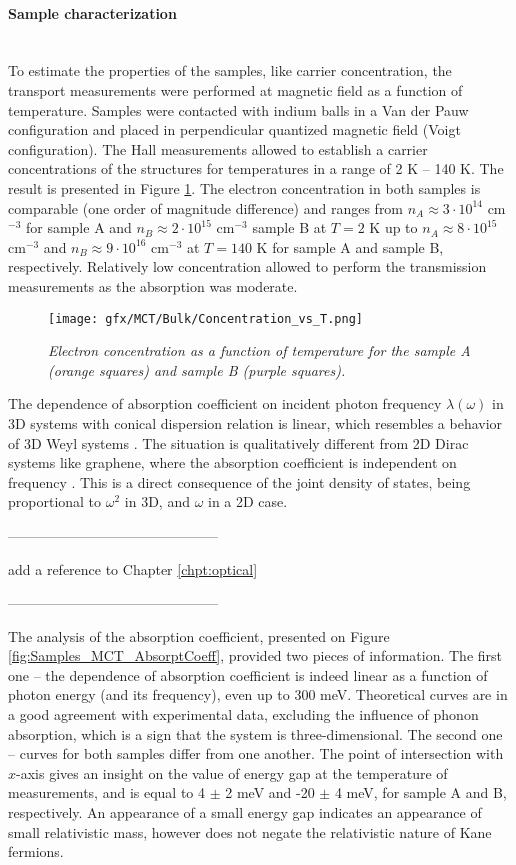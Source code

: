 \documentclass[titlepage,a4paper]{book}
\newcommand{\wciecie}{\quad\phantom{v}}
\newcommand{\myparagraph}[1]{\paragraph{#1}\mbox{}\\}
\begin{document}
\myparagraph{Sample characterization}
\wciecie
To estimate the properties of the samples, like carrier concentration, the transport measurements were performed at magnetic field as a function of temperature. Samples were contacted with indium balls in a Van der Pauw configuration and placed in perpendicular quantized magnetic field (Voigt configuration). The Hall measurements allowed to establish a carrier concentrations of the structures for temperatures in a range of 2 K -- 140 K. The result is presented in Figure \ref{fig:Samples_MCT_Transport}. The electron concentration in both samples is comparable (one order of magnitude difference) and ranges from $n_A \approx 3 \cdot 10^{14}$ cm$^{-3}$ for sample A and $n_B \approx 2 \cdot 10^{15}$ cm$^{-3}$ sample B at $T = 2$ K up to $n_A \approx 8 \cdot 10^{15}$ cm$^{-3}$ and $n_B \approx 9 \cdot 10^{16}$ cm$^{-3}$ at $T = 140$ K for sample A and sample B, respectively. Relatively low concentration allowed to perform the transmission measurements as the absorption was moderate.
\begin{figure}[ht]
	\centering
	\texttt{[image: gfx/MCT/Bulk/Concentration\_vs\_T.png]}
	\vspace{-10pt}
	\caption{\textit{Electron concentration as a function of temperature for the sample A (orange squares) and sample B (purple squares).}}
	\label{fig:Samples_MCT_Transport}
\end{figure} 

The dependence of absorption coefficient on incident photon frequency $\lambda (\omega)$ in 3D systems with conical dispersion relation is linear, which resembles a behavior of 3D Weyl systems \cite{Malcolm_MCT}. The situation is qualitatively different from 2D Dirac systems like graphene, where the absorption coefficient is independent on frequency \cite{Kuzmenko_MCTBulk}. This is a direct consequence of the joint density of states, being proportional to $\omega^2$ in 3D, and $\omega$ in a 2D case.  

---------------------------------------------

add a reference to Chapter \ref{chpt:optical}

---------------------------------------------

The analysis of the absorption coefficient, presented on Figure \ref{fig:Samples_MCT_AbsorptCoeff}, provided two pieces of information. The first one -- the dependence of absorption coefficient is indeed linear as a function of photon energy (and its frequency), even up to 300 meV. Theoretical curves are in a good agreement with experimental data, excluding the influence of phonon absorption, which is a sign that the system is three-dimensional. The second one -- curves for both samples differ from one another. The point of intersection with $x$-axis gives an insight on the value of energy gap at the temperature of measurements, and is equal to 4 $\pm$ 2 meV and -20 $\pm$ 4 meV, for sample A and B, respectively. An appearance of a small energy gap indicates an appearance of small relativistic mass, however does not negate the relativistic nature of Kane fermions.   
\end{document}
